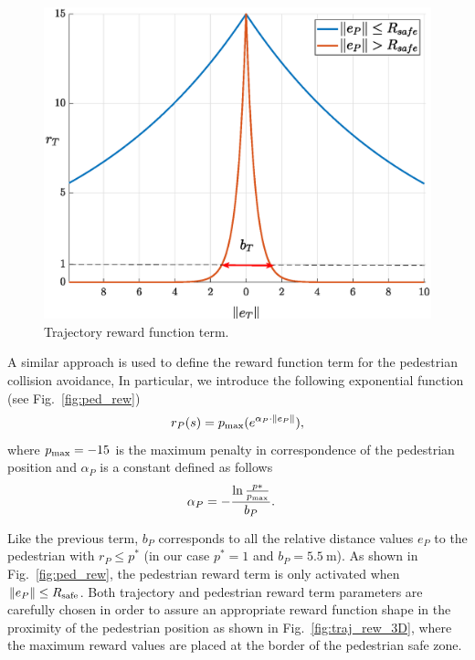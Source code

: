 \begin{figure}[ht]
	\centering
	\includegraphics[scale=0.5]{figure/Part2/Chapter5/Images/reward_trajectory_final.eps}
	\caption{Trajectory reward function term.}
	\label{fig:traj_rew}
\end{figure} 

A similar approach is used to define the reward function term for the pedestrian collision avoidance, In particular, we introduce the following exponential function (see Fig.~\ref{fig:ped_rew})
\begin{equation}
	r_P (s) = 
	p_{ \rm max} (e^{ \alpha_{P} \cdot  \| e_P \|}),
\end{equation}
where  $p_{\rm max}=-15$  is the maximum penalty in correspondence of the pedestrian position and $\alpha_{P}$ is a constant defined as follows
\begin{equation}
	\alpha_{P} =  -\frac{\ln\frac{p*}{p_{\rm max}}}{b_P}. \quad 
\end{equation}

Like the previous term,  $b_{P}$ corresponds to all the relative distance values $e_P$ to the pedestrian  with $r_P \le p^*$ (in our case $p^*=1$ and $b_P = \SI{5.5}{\metre}$). As shown in Fig.~\ref{fig:ped_rew}, the pedestrian reward term is only activated when $\|e_P\| \le R_{\rm safe}$.
Both trajectory and pedestrian reward term parameters are carefully chosen in order to assure an appropriate reward function shape in the proximity of the pedestrian position as shown in Fig.~\ref{fig:traj_rew_3D}, where the maximum reward values are placed at the border of the pedestrian safe zone. 

